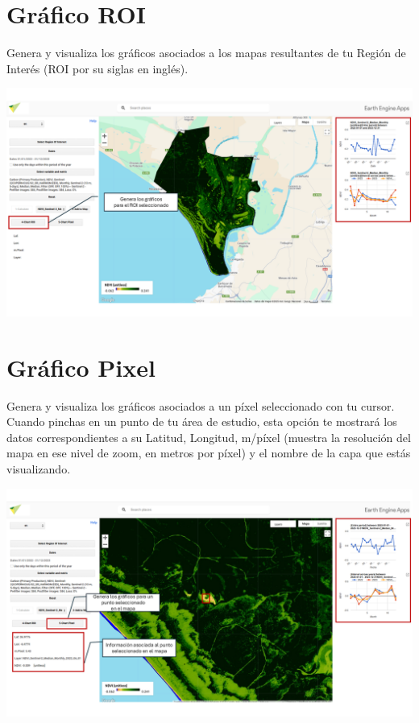 \documentclass[
]{book}
\begin{document}
\section{\texorpdfstring{\textbf{Gráfico ROI}}{Gráfico ROI}}\label{gruxe1fico-roi}

Genera y visualiza los gráficos asociados a los mapas resultantes de tu Región de Interés (ROI por su siglas en inglés).

\includegraphics{assets/graphs_es.png}

\section{\texorpdfstring{\textbf{Gráfico Pixel}}{Gráfico Pixel}}\label{gruxe1fico-pixel}

Genera y visualiza los gráficos asociados a un píxel seleccionado con tu cursor. Cuando pinchas en un punto de tu área de estudio, esta opción te mostrará los datos correspondientes a su Latitud, Longitud, m/píxel (muestra la resolución del mapa en ese nivel de zoom, en metros por píxel) y el nombre de la capa que estás visualizando.

\includegraphics{assets/chart_pixel_es.png}

  
\end{document}
